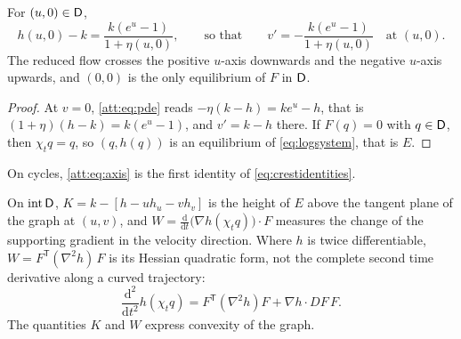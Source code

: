 \begin{lemma}\label{att:lem:axis}
For $(u,0)\in\mathsf D$,
\begin{equation}\label{att:eq:axis}
h(u,0)-k=\frac{k(e^{u}-1)}{1+\eta(u,0)},\qquad\text{so that}\qquad v'=-\frac{k(e^{u}-1)}{1+\eta(u,0)}\quad\text{at }(u,0).
\end{equation}
The reduced flow crosses the positive $u$-axis downwards and the negative $u$-axis upwards, and $(0,0)$ is the only equilibrium of $F$ in $\mathsf D$.
\end{lemma}
\begin{proof}
At $v=0$, \eqref{att:eq:pde} reads $-\eta(k-h)=ke^{u}-h$, that is $(1+\eta)(h-k)=k(e^{u}-1)$, and $v'=k-h$ there. If $F(q)=0$ with $q\in\mathsf D$, then $\chi_tq=q$, so $(q,h(q))$ is an equilibrium of \eqref{eq:logsystem}, that is $E$.
\end{proof}
On cycles, \eqref{att:eq:axis} is the first identity of \eqref{eq:crestidentities}.

\begin{remark}\label{att:rem:convexgauges}
On $\operatorname{int}\mathsf D$, $K=k-[h-uh_u-vh_v]$ is the height of $E$ above the tangent plane of the graph at $(u,v)$, and $W=\frac{\mathrm d}{\mathrm dt}\bigl(\nabla h(\chi_tq)\bigr)\cdot F$ measures the change of the supporting gradient in the velocity direction. Where $h$ is twice differentiable, $W=F^{\mathsf T}(\nabla^2h)\,F$ is its Hessian quadratic form, not the complete second time derivative along a curved trajectory:
\[
\frac{\mathrm d^2}{\mathrm dt^2}h(\chi_tq)
=F^{\mathsf T}(\nabla^2h)F+\nabla h\cdot DF\,F.
\]
The quantities $K$ and $W$ express convexity of the graph.
\end{remark}

